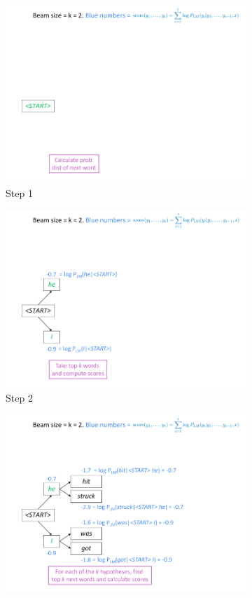 \documentclass[11pt]{article}
\begin{document}
\begin{figure}[htb]
	\centering
	\begin{subfigure}[h]{0.45\linewidth}
		\includegraphics[width=0.8\linewidth]{img/beam_search01}
		\caption{Step 1}
	\end{subfigure}
	\hspace{1em}
	\begin{subfigure}[h]{0.45\linewidth}
		\includegraphics[width=0.8\linewidth]{img/beam_search02}
		\caption{Step 2}
	\end{subfigure}
	\begin{subfigure}[h]{0.45\linewidth}
		\includegraphics[width=0.8\linewidth]{img/beam_search03}

\end{subfigure}
\end{figure}
\end{document}
